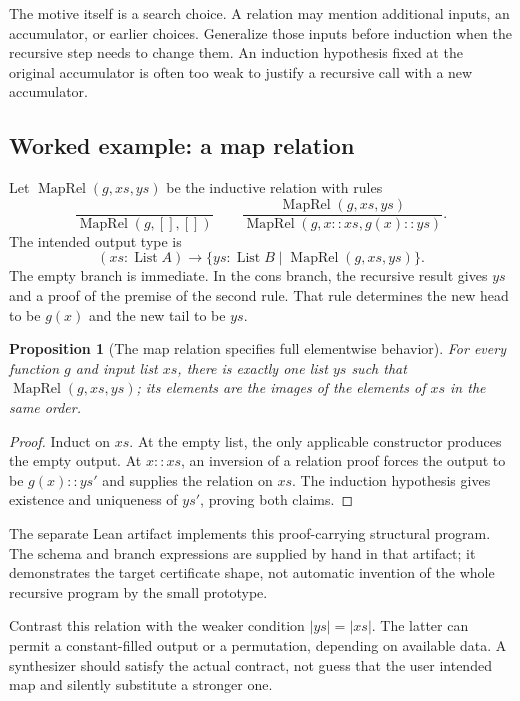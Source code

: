 \documentclass[11pt,letterpaper]{article}
\newcommand{\code}[1]{\texttt{\detokenize{#1}}}
\newtheorem{proposition}[theorem]{Proposition}
\theoremstyle{definition}\newtheorem{definition}[theorem]{Definition}
\theoremstyle{remark}\newtheorem{remark}[theorem]{Remark}
\begin{document}
The motive itself is a search choice. A relation may mention additional inputs,
an accumulator, or earlier choices. Generalize those inputs before induction
when the recursive step needs to change them. An induction hypothesis fixed at
the original accumulator is often too weak to justify a recursive call with a
new accumulator.

\subsection{Worked example: a map relation}

Let $\operatorname{MapRel}(g,xs,ys)$ be the inductive relation with rules
\[
 \frac{}{\operatorname{MapRel}(g,[],[])}\qquad
 \frac{\operatorname{MapRel}(g,xs,ys)}
 {\operatorname{MapRel}(g,x::xs,g(x)::ys)}.
\]
The intended output type is
\[
 (xs:\operatorname{List}A)\to
 \{ys:\operatorname{List}B\mid\operatorname{MapRel}(g,xs,ys)\}.
\]
The empty branch is immediate. In the cons branch, the recursive result gives
$ys$ and a proof of the premise of the second rule. That rule determines the
new head to be $g(x)$ and the new tail to be $ys$.

\begin{proposition}[The map relation specifies full elementwise behavior]
For every function $g$ and input list $xs$, there is exactly one list $ys$ such
that $\operatorname{MapRel}(g,xs,ys)$; its elements are the images of the elements
of $xs$ in the same order.
\end{proposition}
\begin{proof}
Induct on $xs$. At the empty list, the only applicable constructor produces the
empty output. At $x::xs$, an inversion of a relation proof forces the output to
be $g(x)::ys'$ and supplies the relation on $xs$. The induction hypothesis gives
existence and uniqueness of $ys'$, proving both claims.
\end{proof}

The separate Lean artifact \code{RecursionCertificates.lean} implements this
proof-carrying structural program. The schema and branch expressions are supplied
by hand in that artifact; it demonstrates the target certificate shape, not
automatic invention of the whole recursive program by the small prototype.

Contrast this relation with the weaker condition $|ys|=|xs|$. The latter can
permit a constant-filled output or a permutation, depending on available data.
A synthesizer should satisfy the actual contract, not guess that the user
intended map and silently substitute a stronger one.
\end{document}
